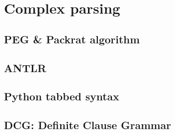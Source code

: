 \part{Complex parsing}

\chapter{PEG \& Packrat algorithm}

\chapter{ANTLR}

\chapter{Python tabbed syntax}

\chapter{DCG: Definite Clause Grammar}
